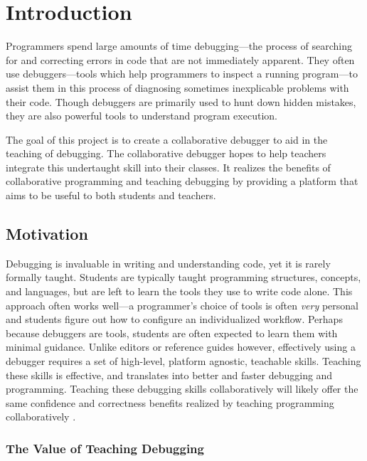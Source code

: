 \documentclass[12pt]{article}
\begin{document}
\tableofcontents
\pagebreak

\section{Introduction}

Programmers spend large amounts of time debugging---the process of
searching for and correcting errors in code that are not immediately
apparent.  They often use debuggers---tools which help programmers to
inspect a running program---to assist them in this process of
diagnosing sometimes inexplicable problems with their code.  Though
debuggers are primarily used to hunt down hidden mistakes, they are
also powerful tools to understand program execution.
\par

The goal of this project is to create a collaborative debugger to aid
in the teaching of debugging.  The collaborative debugger hopes to
help teachers integrate this undertaught skill into their classes.  It
realizes the benefits of collaborative programming and teaching
debugging by providing a platform that aims to be useful to both
students and teachers.

\subsection{Motivation}

Debugging is invaluable in writing and understanding code, yet it is
rarely formally taught\cite{doi:10.1080/08993400802114581}.  Students
are typically taught programming structures, concepts, and languages,
but are left to learn the tools they use to write code alone.  This
approach often works well---a programmer's choice of tools is often
\textit{very} personal and students figure out how to configure an
individualized workflow.  Perhaps because debuggers are tools,
students are often expected to learn them with minimal guidance.
Unlike editors or reference guides however, effectively using a
debugger requires a set of high-level, platform agnostic, teachable
skills.  Teaching these skills is effective, and translates into
better and faster debugging and
programming\cite{10.1145/3286960.3286970}\cite{10.1145/3361721.3361724}.
Teaching these debugging skills collaboratively will likely offer the
same confidence and correctness benefits realized by teaching
programming collaboratively
\cite{10.1145/1026487.1008043}\cite{10.1145/1145287.1145293}.

\subsubsection{The Value of Teaching Debugging}
\end{document}
